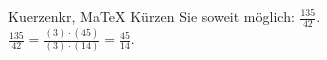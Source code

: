 \begin{MAufgabe}{Kuerzen}{kr, MaTeX}
K\"urzen Sie soweit m\"oglich: $\frac{135}{42}$.\\ 
\ifLsg\MLoesung
\quad $\frac{135}{42}=\frac{(3)\cdot(45)}{(3)\cdot(14)}=\frac{45}{14}$.\else\relax\fi
 \end{MAufgabe}